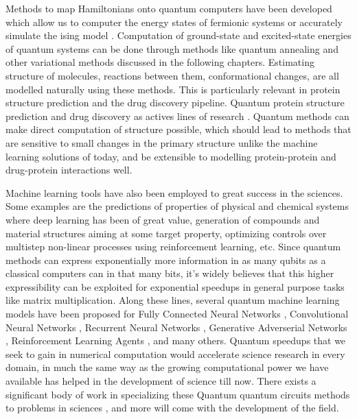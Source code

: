 Methods to map Hamiltonians onto quantum computers have been developed which allow us to computer the energy states of fermionic systems or accurately simulate the ising model \cite{qmap-jordan-wigner,qmap-bravyi-kitaev,qmap-jordan-wigner-nielsen,qmap-bravyi-kitaev-electronic-structure-simulation,qmap-comparative-bravyi-jordan}. Computation of ground-state and excited-state energies \cite{guzik-molecular-energy} of quantum systems can be done through methods like quantum annealing \cite{quantum-annealing} and other variational methods discussed in the following chapters. Estimating structure of molecules, reactions between them, conformational changes, are all modelled naturally using these methods. This is particularly relevant in protein structure prediction and the drug discovery pipeline. Quantum protein structure prediction \cite{qpf-simulating-chemistry,qpf-resource-efficient-algo} and drug discovery as actives lines of research \cite{qdd-drug-discovery-potential,qdd-drug-discovery-industry}. Quantum methods can make direct computation of structure possible, which should lead to methods that are sensitive to small changes in the primary structure unlike the machine learning solutions of today, and be extensible to modelling protein-protein and drug-protein interactions well.

Machine learning tools have also been employed to great success in the sciences. Some examples are the predictions of properties of physical and chemical systems where deep learning has been of great value, generation of compounds and material structures aiming at some target property, optimizing controls over multistep non-linear processes using reinforcement learning, etc. Since quantum methods can express exponentially more information in as many qubits as a classical computers can in that many bits, it's widely believes that this higher expressibility can be exploited for exponential speedups in general purpose tasks like matrix multiplication. Along these lines, several quantum machine learning models have been proposed for Fully Connected Neural Networks \cite{qml-nn}, Convolutional Neural Networks \cite{qml-cnn}, Recurrent Neural Networks \cite{qml-rnn}, Generative Adverserial Networks \cite{qml-gan}, Reinforcement Learning Agents \cite{qml-rl,future-vqe-for-deep-rl}, and many others. Quantum speedups that we seek to gain in numerical computation would accelerate science research in every domain, in much the same way as the growing computational power we have available has helped in the development of science till now. There exists a significant body of work in specializing these Quantum quantum circuits methods to problems in sciences \cite{qmldd-drug-discovery-generative,qmldd-drug-discovery-qml,qmldd-drug-discovery-using-qml}, and more will come with the development of the field.

